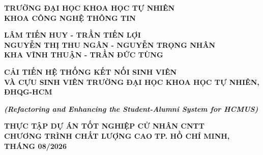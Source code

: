 \documentclass[12pt,a4paper,oneside]{report}
\begin{document}
\begin{titlepage}
\begin{center}
{\fontsize{12}{18}\selectfont \textbf{TRƯỜNG ĐẠI HỌC KHOA HỌC TỰ NHIÊN}}\\[2pt]
{\fontsize{12}{18}\selectfont \textbf{KHOA CÔNG NGHỆ THÔNG TIN}}

\par\vspace{3cm}
{\fontsize{12}{18}\selectfont \textbf{LÂM TIẾN HUY - TRẦN TIẾN LỢI}}\\[3pt]
{\fontsize{12}{18}\selectfont \textbf{NGUYỄN THỊ THU NGÂN - NGUYỄN TRỌNG NHÂN}}\\[3pt]
{\fontsize{12}{18}\selectfont \textbf{KHA VĨNH THUẬN - TRẦN ĐỨC TÙNG}}

\par\vspace{3cm}
{\fontsize{15}{21.5}\selectfont\bfseries CẢI TIẾN HỆ THỐNG KẾT NỐI SINH VIÊN\\[6pt]
VÀ CỰU SINH VIÊN TRƯỜNG ĐẠI HỌC KHOA HỌC TỰ NHIÊN, ĐHQG-HCM}

\par\vspace{0.4cm}
{\fontsize{12}{16}\selectfont\bfseries\itshape (Refactoring and Enhancing the Student-Alumni System for HCMUS)}

\par\vspace{3cm}
{\fontsize{12}{18}\selectfont\bfseries THỰC TẬP DỰ ÁN TỐT NGHIỆP CỬ NHÂN CNTT}\\[6pt]
{\fontsize{12}{18}\selectfont\bfseries CHƯƠNG TRÌNH CHẤT LƯỢNG CAO}
\vfill
{\fontsize{12}{18}\selectfont\bfseries TP. HỒ CHÍ MINH, THÁNG 08/2026}
\end{center}
\end{titlepage}
\end{document}

